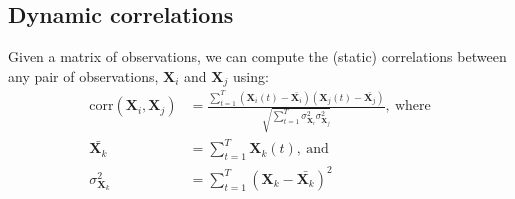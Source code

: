 \documentclass[english]{article}
\begin{document}
\subsection*{Dynamic correlations}
Given a matrix of observations, we can compute the (static)
correlations between any pair of observations, $\mathbf{X}_i$ and
$\mathbf{X}_j$ using:
\begin{align}
  \mathrm{corr}(\mathbf{X}_i, \mathbf{X}_j) &= \frac{\sum_{t=1}^T \left(\mathbf{X}_i(t)
                                              -
                                              \bar{\mathbf{X}_i}\right) \left(\mathbf{X}_j(t)
                                              -
                                              \bar{\mathbf{X}_j}\right)}{\sqrt{\sum_{t=1}^T
                                              \sigma^2_{\mathbf{X}_i} 
                                              \sigma^2_{\mathbf{X}_j}}},~\mathrm{where}\\\label{eqn:corr}
  \bar{\mathbf{X}_k} &= \sum_{t=1}^T
                       \mathbf{X}_k(t),~\mathrm{and}\\
  \sigma^2_{\mathbf{X}_k} &= \sum_{t=1}^T \left( \mathbf{X}_k -
                            \bar{\mathbf{X}_k} \right)^2 
\end{align}
\end{document}
